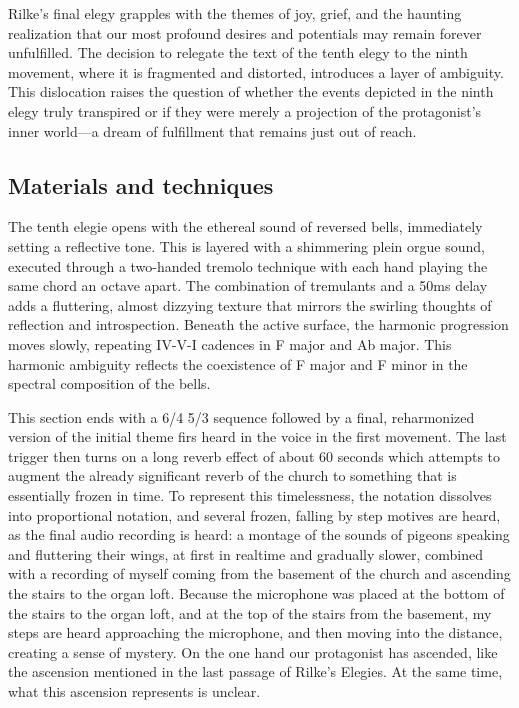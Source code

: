 \documentclass[12pt,twoside,maitrise]{dms_ks}
\theoremstyle{definition}
\begin{document}
Rilke’s final elegy grapples with the themes of joy, grief, and the haunting realization that our most profound desires and potentials may remain forever unfulfilled. 
The decision to relegate the text of the tenth elegy to the ninth movement, where it is fragmented and distorted, introduces a layer of ambiguity. 
This dislocation raises the question of whether the events depicted in the ninth elegy truly transpired or if they were merely a projection of the protagonist's inner world—a dream of fulfillment that remains just out of reach.

\subsection{Materials and techniques}

The tenth elegie opens with the ethereal sound of reversed bells, immediately setting a reflective tone. 
This is layered with a shimmering plein orgue sound, executed through a two-handed tremolo technique with each hand playing the same chord an octave apart. 
The combination of tremulants and a 50ms delay adds a fluttering, almost dizzying texture that mirrors the swirling thoughts of reflection and introspection. 
Beneath the active surface, the harmonic progression moves slowly, repeating IV-V-I cadences in F major and Ab major. 
This harmonic ambiguity reflects the coexistence of F major and F minor in the spectral composition of the bells.



This section ends with a 6/4 5/3 sequence followed by a final, reharmonized version of the initial theme firs heard in the voice in the first movement. 
The last trigger then turns on a long reverb effect of about 60 seconds which attempts to augment the already significant reverb of the church to something that is essentially frozen in time. 
To represent this timelessness, the notation dissolves into proportional notation, and several frozen, falling by step motives are heard, as the final audio recording is heard: a montage of the sounds of pigeons speaking and fluttering their wings, at first in realtime and gradually slower, combined with a recording of myself coming from the basement of the church and ascending the stairs to the organ loft. 
Because the microphone was placed at the bottom of the stairs to the organ loft, and at the top of the stairs from the basement, my steps are heard approaching the microphone, and then moving into the distance, creating a sense of mystery. 
On the one hand our protagonist has ascended, like the ascension mentioned in the last passage of Rilke's Elegies. 
At the same time, what this ascension represents is unclear.
\end{document}
